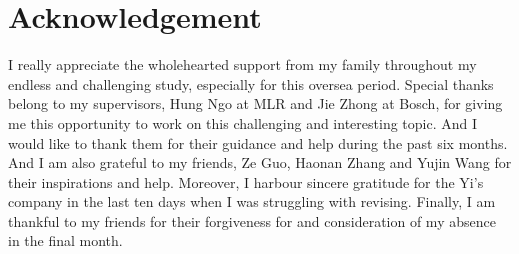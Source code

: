 \documentclass[a4paper,12pt]{article}
\begin{document}


\clearpage



\section*{Acknowledgement}
I really appreciate the wholehearted support from my family throughout my endless and challenging  study, especially for this oversea period. Special thanks belong to my supervisors, Hung Ngo at MLR and Jie Zhong at Bosch, for giving me this opportunity to work on this challenging and interesting topic. And I would like to thank them for their guidance and help during the past six months. And I am also grateful to my friends, Ze Guo, Haonan Zhang and Yujin Wang for their inspirations and help. Moreover, I harbour sincere gratitude for the Yi's company in the last ten days when I was struggling with revising. Finally, I am thankful to my friends for their forgiveness for and consideration of my absence in the final month.

\Affirmation
\end{document}
